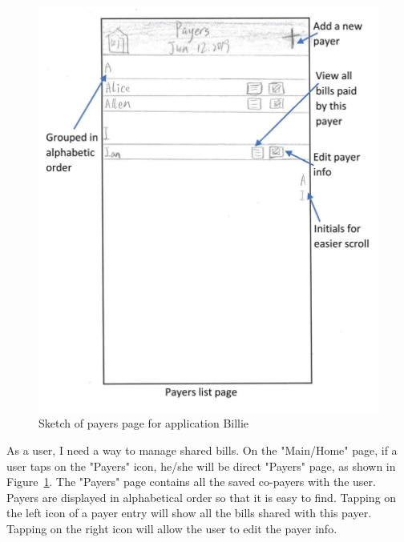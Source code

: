 \documentclass{sigchi}
\begin{document}
\begin{figure}[h!]
\centering
  \includegraphics[width=0.6\columnwidth]{22-payers-page.jpg}
  \caption{Sketch of payers page for application Billie}
  \label{fig:figure37}
\end{figure}
As a user, I need a way to manage shared bills. On the "Main/Home" page, if a user taps on the "Payers" icon, he/she will be direct "Payers" page, as shown in Figure~\ref{fig:figure37}. The "Payers" page contains all the saved co-payers with the user. Payers are displayed in alphabetical order so that it is easy to find. Tapping on the left icon of a payer entry will show all the bills shared with this payer. Tapping on the right icon will allow the user to edit the payer info.
\end{document}
